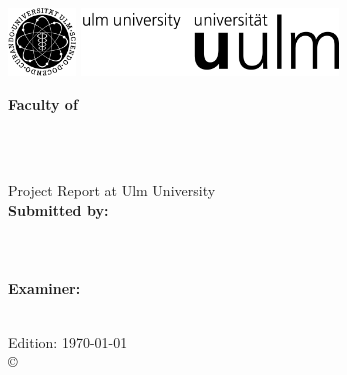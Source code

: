 \frontmatter

\thispagestyle{empty}
\begin{addmargin*}[4mm]{-1mm}
	
	\includegraphics[height=1.8cm]{images/unilogo_bild}
	\hfill
	\includegraphics[height=1.8cm]{images/unilogo_wort}\\[1em]
	
	{\footnotesize
		\hspace*{99mm}\parbox[t]{44mm}{\bfseries Faculty of \fakultaet\\
			\mdseries \institut}\\[2cm]
		
		\parbox{143mm}{\bfseries \LARGE \titel}\\[2.5em]
		{\footnotesize Project Report at Ulm University}\\[3em]
		
		{\footnotesize \bfseries Submitted by:}\\
		{\footnotesize \fullname\\ \email}\\ \matnr\\[2em]
		{\footnotesize \bfseries Examiner:}\\                     
		{\footnotesize \gutachterA}\\[2em]
		{\footnotesize \jahr}
	}
\end{addmargin*}


\clearpage
\thispagestyle{empty}
{ \small
	\flushleft
	Edition: \today \\\vfill
	\copyright~\jahr~\fullname
}